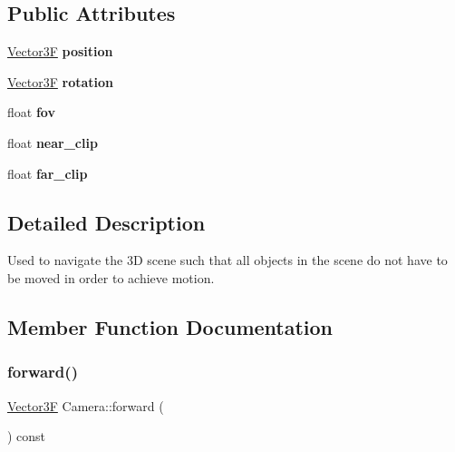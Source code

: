 \subsection*{Public Attributes}
\begin{DoxyCompactItemize}
\item 
\mbox{\label{class_camera_a24e0a32af9643efb3e81306e184417ea}} 
\mbox{\hyperlink{class_vector3}{Vector3F}} {\bfseries position}
\item 
\mbox{\label{class_camera_a573539a21c05976f45ca9d1d1fab937d}} 
\mbox{\hyperlink{class_vector3}{Vector3F}} {\bfseries rotation}
\item 
\mbox{\label{class_camera_aff7393c9cfbccd7e369091f00008da93}} 
float {\bfseries fov}
\item 
\mbox{\label{class_camera_a1a1001125f472d5aff8ca9b27c04675c}} 
float {\bfseries near\+\_\+clip}
\item 
\mbox{\label{class_camera_af93067b3c46c4525dfdf1d192457c277}} 
float {\bfseries far\+\_\+clip}
\end{DoxyCompactItemize}


\subsection{Detailed Description}
Used to navigate the 3D scene such that all objects in the scene do not have to be moved in order to achieve motion. 

\subsection{Member Function Documentation}
\mbox{\label{class_camera_a862269b762daf00f14a5926d77331ec9}} 
\subsubsection{\texorpdfstring{forward()}{forward()}}
{\footnotesize\ttfamily \mbox{\hyperlink{class_vector3}{Vector3F}} Camera\+::forward (\begin{DoxyParamCaption}{ }\end{DoxyParamCaption}) const}

